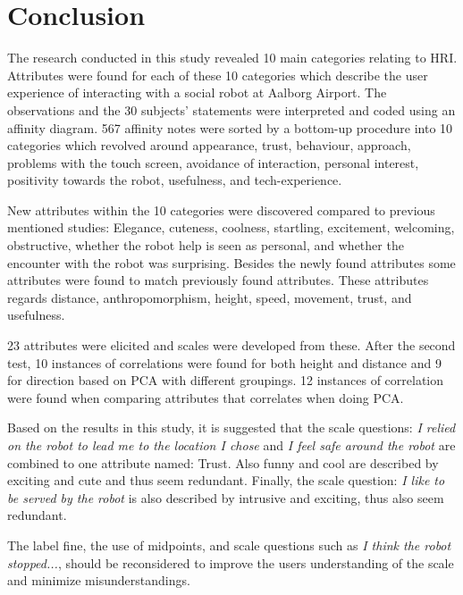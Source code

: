 \section{Conclusion}
\label{Conclusion}
%
The research conducted in this study revealed 10 main categories relating to HRI. Attributes were found for each of these 10 categories which describe the user experience of interacting with a social robot at Aalborg Airport. The observations and the 30 subjects' statements were interpreted and coded using an affinity diagram. 567 affinity notes were sorted by a bottom-up procedure into 10 categories which revolved around appearance, trust, behaviour, approach, problems with the touch screen, avoidance of interaction, personal interest, positivity towards the robot, usefulness, and tech-experience.

New attributes within the 10 categories were discovered compared to previous mentioned studies: Elegance, cuteness, coolness, startling, excitement, welcoming, obstructive, whether the robot help is seen as personal, and whether the encounter with the robot was surprising. Besides the newly found attributes some attributes were found to match previously found attributes. These attributes regards distance, anthropomorphism, height, speed, movement, trust, and usefulness.

23 attributes were elicited and scales were developed from these. After the second test, 10 instances of correlations were found for both height and distance and 9 for direction based on PCA with different groupings. 12 instances of correlation were found when comparing attributes that correlates when doing PCA.

Based on the results in this study, it is suggested that the scale questions: \textit{I relied on the robot to lead me to the location I chose} and \textit{I feel safe around the robot} are combined to one attribute named: Trust. Also funny and cool are described by exciting and cute and thus seem redundant. Finally, the scale question: \textit{I like to be served by the robot} is also described by intrusive and exciting, thus also seem redundant.

The label fine, the use of midpoints, and scale questions such as \textit{I think the robot stopped...}, should be reconsidered to improve the users understanding of the scale and minimize misunderstandings. 


